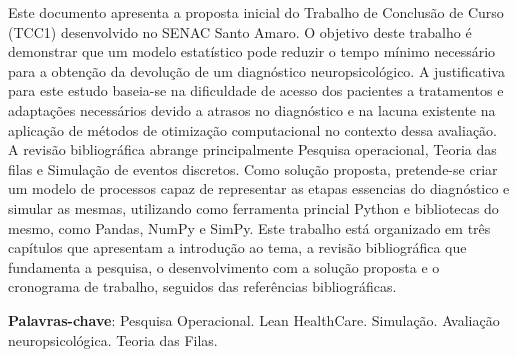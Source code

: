 \documentclass[
    12pt,                %
    openright,           %
    oneside,             %
    a4paper,             %
    english,             %
    brazil               %
]{abntex2}
\begin{document}

\frenchspacing

\pretextual

\imprimircapa

\imprimirfolhaderosto

\begin{resumo}
Este documento apresenta a proposta inicial do Trabalho de Conclusão de Curso (TCC1) desenvolvido no SENAC Santo Amaro. O objetivo deste trabalho é demonstrar que um modelo estatístico pode reduzir o tempo mínimo necessário para a obtenção da devolução de um diagnóstico neuropsicológico. A justificativa para este estudo baseia-se na dificuldade de acesso dos pacientes a tratamentos e adaptações necessários devido a atrasos no diagnóstico e na lacuna existente na aplicação de métodos de otimização computacional no contexto dessa avaliação. A revisão bibliográfica abrange principalmente Pesquisa operacional, Teoria das filas e Simulação de eventos discretos. Como solução proposta, pretende-se criar um modelo de processos capaz de representar as etapas essencias do diagnóstico e simular as mesmas, utilizando como ferramenta princial Python e bibliotecas do mesmo, como Pandas, NumPy e SimPy. Este trabalho está organizado em três capítulos que apresentam a introdução ao tema, a revisão bibliográfica que fundamenta a pesquisa, o desenvolvimento com a solução proposta e o cronograma de trabalho, seguidos das referências bibliográficas.

\vspace{\onelineskip}

\noindent
\textbf{Palavras-chave}: Pesquisa Operacional. Lean HealthCare. Simulação. Avaliação neuropsicológica. Teoria das Filas.
\end{resumo}

\listoffigures*
\cleardoublepage
\end{document}
